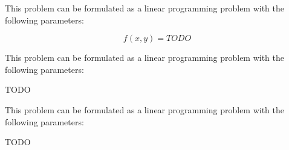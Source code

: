 \documentclass[11pt]{article}
\begin{document}
\begin{prob}{1}
\end{prob}
\begin{sol} 

This problem can be formulated as a linear programming problem with the following parameters:

\begin{equation*}
f(x,y) = TODO
\end{equation*}
\end{sol}

\begin{prob}{2}
\end{prob}
\begin{sol} 
This problem can be formulated as a linear programming problem with the following parameters:

TODO
\end{sol}

\begin{prob}{3}
\end{prob}
\begin{sol} 
This problem can be formulated as a linear programming problem with the following parameters:

TODO
\end{sol}
\end{document}

